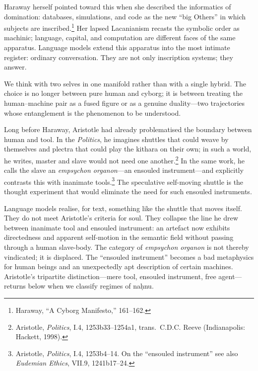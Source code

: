\documentclass[12pt,a4paper]{article}
\begin{document}
Haraway herself pointed toward this when she described the informatics of domination: databases, simulations, and code as the new ``big Others'' in which subjects are inscribed.\footnote{Haraway, ``A Cyborg Manifesto,'' 161--162.} Her lapsed Lacanianism recasts the symbolic order as machinic; language, capital, and computation are different faces of the same apparatus. Language models extend this apparatus into the most intimate register: ordinary conversation. They are not only inscription systems; they answer.

We think with two selves in one manifold rather than with a single hybrid. The choice is no longer between pure human and cyborg; it is between treating the human--machine pair as a fused figure or as a genuine duality---two trajectories whose entanglement is the phenomenon to be understood.

Long before Haraway, Aristotle had already problematised the boundary between human and tool. In the \emph{Politics}, he imagines shuttles that could weave by themselves and plectra that could play the kithara on their own; in such a world, he writes, master and slave would not need one another.\footnote{Aristotle, \emph{Politics}, I.4, 1253b33--1254a1, trans.\ C.D.C. Reeve (Indianapolis: Hackett, 1998).} In the same work, he calls the slave an \emph{empsychon organon}---an ensouled instrument---and explicitly contrasts this with inanimate tools.\footnote{Aristotle, \emph{Politics}, I.4, 1253b4--14. On the ``ensouled instrument'' see also \emph{Eudemian Ethics}, VII.9, 1241b17--24.} The speculative self-moving shuttle is the thought experiment that would eliminate the need for such ensouled instruments.

Language models realise, for text, something like the shuttle that moves itself. They do not meet Aristotle's criteria for soul. They collapse the line he drew between inanimate tool and ensouled instrument: an artefact now exhibits directedness and apparent self-motion in the semantic field without passing through a human slave-body. The category of \emph{empsychon organon} is not thereby vindicated; it is displaced. The ``ensouled instrument'' becomes a bad metaphysics for human beings and an unexpectedly apt description of certain machines. Aristotle's tripartite distinction---mere tool, ensouled instrument, free agent---returns below when we classify regimes of na\d{h}nu.
\end{document}
